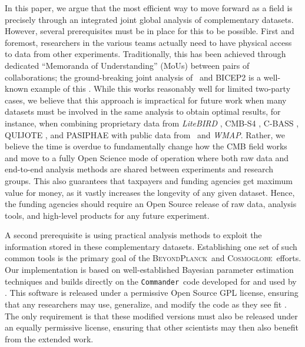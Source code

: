 \documentclass[twocolumn]{openjournal}
\def\WMAP{\textit{WMAP}}
\def\commander{\texttt{Commander}}
\newcommand{\BP}{\textsc{BeyondPlanck}}
\newcommand{\cosmoglobe}{\textsc{Cosmoglobe}}
\begin{document}
In this paper, we argue that the most efficient way to move forward as a field
is precisely through an integrated joint global analysis of complementary
datasets. However, several prerequisites must be in place for this to be
possible. First and foremost, researchers in the various teams actually need to
have physical access to data from other experiments. Traditionally, this has
been achieved through dedicated ``Memoranda of Understanding'' (MoUs) between
pairs of collaborations; the ground-breaking joint analysis of \Planck\ and
BICEP2 is a well-known example of this \citep{pb2015}. While this works
reasonably well for limited two-party cases, we believe that this approach is
impractical for future work when many datasets must be involved in the same
analysis to obtain optimal results, for instance, when combining proprietary
data from \textit{LiteBIRD} \citep{litebird2020}, CMB-S4 \citep{cmbS4}, C-BASS
\citep{cbass18}, QUIJOTE \citep{QUIJOTE_I_2015}, and PASIPHAE
\citep{tassis:2018} with public data from \Planck\ and \WMAP. Rather, we
believe the time is overdue to fundamentally change how the CMB field works and
move to a fully Open Science mode of operation where both raw data and
end-to-end analysis methods are shared between experiments and research groups.
This also guarantees that taxpayers and funding agencies get maximum value for
money, as it vastly increases the longevity of any given dataset. Hence, the
funding agencies should require an Open Source release of raw data, analysis
tools, and high-level products for any future experiment.

A second prerequisite is using practical analysis methods to exploit the
information stored in these complementary datasets. Establishing one set of
such common tools is the primary goal of the \BP\ and \cosmoglobe\ efforts. Our
implementation is based on well-established Bayesian parameter estimation
techniques and builds directly on the \commander\ code developed for and used
by \Planck. This software is released under a permissive Open Source GPL
license, ensuring that any researchers may use, generalize, and modify the code
as they see fit \citep{bp01,bp03}. The only requirement is that these modified
versions must also be released under an equally permissive license, ensuring
that other scientists may then also benefit from the extended work. 
\end{document}
